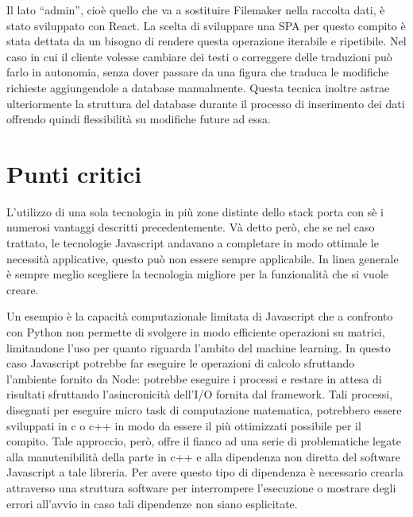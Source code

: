 Il lato “admin”, cioè quello che va a sostituire Filemaker nella raccolta dati, è stato sviluppato con React. La scelta di sviluppare una SPA\cite{SPA} per questo compito è stata dettata da un bisogno di rendere questa operazione iterabile e ripetibile. Nel caso in cui il cliente volesse cambiare dei testi o correggere delle traduzioni può farlo in autonomia, senza dover passare da una figura che traduca le modifiche richieste aggiungendole a database manualmente. Questa tecnica inoltre astrae ulteriormente la struttura del database durante il processo di inserimento dei dati offrendo quindi flessibilità su modifiche future ad essa.


\section{Punti critici}\vspace{5mm}

L'utilizzo di una sola tecnologia in più zone distinte dello stack porta con sè i numerosi vantaggi descritti precedentemente. Và detto però, che se nel caso trattato, le tecnologie Javascript andavano a completare in modo ottimale le necessità applicative, questo può non essere sempre applicabile. In linea generale è sempre meglio scegliere la tecnologia migliore per la funzionalità che si vuole creare.\vspace{5mm}

Un esempio è la capacità computazionale limitata di Javascript che a confronto con Python\cite{Python} non permette di svolgere in modo efficiente operazioni su matrici, limitandone l'uso per quanto riguarda l'ambito del machine learning. In questo caso Javascript potrebbe far eseguire le operazioni di calcolo sfruttando l'ambiente fornito da Node: potrebbe eseguire i processi e restare in attesa di risultati sfruttando l'asincronicità dell'I/O fornita dal framework. Tali processi, disegnati per eseguire micro task di computazione matematica, potrebbero essere sviluppati in c o c++ in modo da essere il più ottimizzati possibile per il compito. Tale approccio, però, offre il fianco ad una serie di problematiche legate alla manutenibilità della parte in c++ e alla dipendenza non diretta del software Javascript a tale libreria. Per avere questo tipo di dipendenza è necessario crearla attraverso una struttura software per interrompere l'esecuzione o mostrare degli errori all'avvio in caso tali dipendenze non siano esplicitate.

